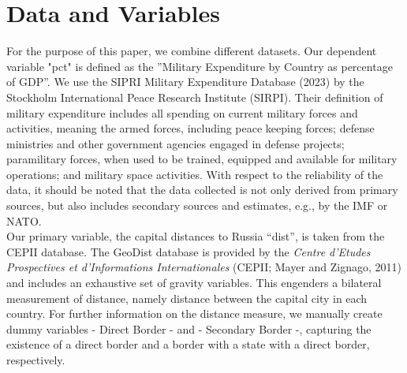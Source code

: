 \documentclass[12pt,a4paper]{article}
\begin{document}
\section{Data and Variables}
For the purpose of this paper, we combine different datasets. Our dependent variable "pct" is defined as the ”Military Expenditure by Country as percentage of GDP”. We use the SIPRI Military Expenditure Database (2023) by the Stockholm International Peace Research Institute (SIRPI). Their definition of military expenditure includes all spending on current military forces and activities, meaning the armed forces, including peace keeping forces; defense ministries and other government agencies engaged in defense projects; paramilitary forces, when used to be trained, equipped and available for military operations; and military space activities. With respect to the reliability of the data, it should be noted that the data collected is not only derived from primary sources, but also includes secondary sources and estimates, e.g., by the IMF or NATO. \\

Our primary variable, the capital distances to Russia “dist”, is taken from the CEPII database. The GeoDist database is provided by the \textit{Centre d’Etudes Prospectives et d’Informations Internationales} (CEPII; Mayer and Zignago, 2011) and includes an exhaustive set of gravity variables. This engenders a bilateral measurement of distance, namely distance between the capital city in each country. For further information on the distance measure, we manually create dummy variables - Direct Border - and - Secondary Border -, capturing the existence of a direct border and a border with a state with a direct border, respectively.\\
\end{document}
